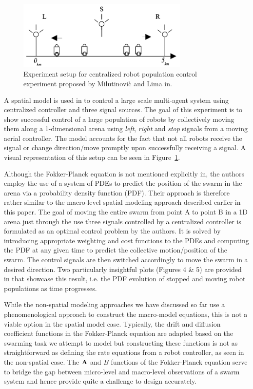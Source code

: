 \documentclass[Main.tex]{subfiles}
\begin{document}
\begin{figure}[!ht]
\centering\includegraphics[width=8.5cm]{assets/spatSignal.png}
\centering\caption{Experiment setup for centralized robot population control experiment proposed by Milutinovi\`{c} and Lima in\cite{Milutinovi2006}.}\label{fig:signal}
\end{figure}

A spatial model is used in\cite{Milutinovi2006} to control a large scale multi-agent system using centralized controller and three signal sources. The goal of this experiment is to show successful control of a large population of robots by collectively moving them along a 1-dimensional arena using \emph{left}, \emph{right} and \emph{stop} signals from a moving aerial controller. The model accounts for the fact that not all robots receive the signal or change direction/move promptly upon successfully receiving a signal. A visual representation of this setup can be seen in Figure~\ref{fig:signal}.

Although the Fokker-Planck equation is not mentioned explicitly in\cite{Milutinovi2006}, the authors employ the use of a system of PDEs to predict the position of the swarm in the arena via a probability density function (PDF). Their approach is therefore rather similar to the macro-level spatial modeling approach described earlier in this paper. The goal of moving the entire swarm  from point A to point B in a 1D arena just through the use three signals controlled by a centralized controller is formulated as an optimal control problem by the authors. It is solved by introducing appropriate weighting and cost functions to the PDEs and computing the PDF at any given time to predict the collective motion/position of the swarm. The control signals are then switched accordingly to move the swarm in a desired direction. Two particularly insightful plots (Figures 4 \& 5) are provided in\cite{Milutinovi2006} that showcase this result, i.e. the PDF evolution of stopped and moving robot populations as time progresses.

While the non-spatial modeling approaches we have discussed so far use a phenomenological approach to construct the macro-model equations, this is not a viable option in the spatial model case. Typically, the drift and diffusion coefficient functions in the Fokker-Planck equation are adapted based on the swarming task we attempt to model but constructing these functions is not as straightforward as defining the rate equations from a robot controller, as seen in the non-spatial case. The $\mathbf{A}$ and $B$ functions of the Fokker-Planck equation serve to bridge the gap between micro-level and macro-level observations of a swarm system and hence provide quite a challenge to design accurately.
\end{document}
